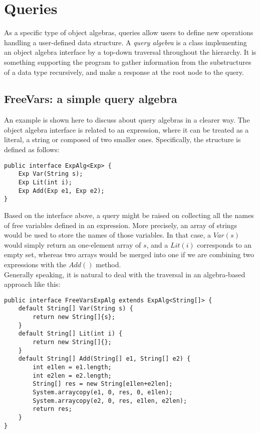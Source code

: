 \section{Queries}\label{sec:queries}

As a specific type of object algebras, queries allow users to define new operations handling a user-defined data structure. A \textit{query algebra} is a class implementing an object algebra interface by a top-down traversal throughout the hierarchy. It is something supporting the program to gather information from the substructures of a data type recursively, and make a response at the root node to the query.\\

\subsection{FreeVars: a simple query algebra}\label{subsec:freevars}

An example is shown here to discuss about query algebras in a clearer way. The object algebra interface is related to an expression, where it can be treated as a literal, a string or composed of two smaller ones. Specifically, the structure is defined as follows:

\begin{lstlisting}[numbers=none]
public interface ExpAlg<Exp> {
    Exp Var(String s);
    Exp Lit(int i);
    Exp Add(Exp e1, Exp e2);
}
\end{lstlisting}

Based on the interface above, a query might be raised on collecting all the names of free variables defined in an expression. More precisely, an array of strings would be used to store the names of those variables. In that case, a $Var(s)$ would simply return an one-element array of $s$, and a $Lit(i)$ corresponds to an empty set, whereas two arrays would be merged into one if we are combining two expressions with the $Add()$ method.\\

Generally speaking, it is natural to deal with the traversal in an algebra-based approach like this:

\begin{lstlisting}[numbers=none]
public interface FreeVarsExpAlg extends ExpAlg<String[]> {
    default String[] Var(String s) {
        return new String[]{s};
    }
    default String[] Lit(int i) {
        return new String[]{};
    }
    default String[] Add(String[] e1, String[] e2) {
        int e1len = e1.length;
        int e2len = e2.length;
        String[] res = new String[e1len+e2len];
        System.arraycopy(e1, 0, res, 0, e1len);
        System.arraycopy(e2, 0, res, e1len, e2len);
        return res;
    }
}
\end{lstlisting}

